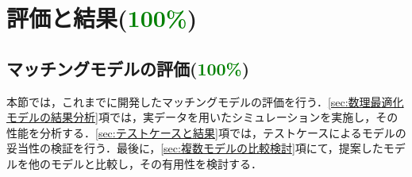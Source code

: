\section{評価と結果(\textcolor{green}{100\%})}
  \label{sec:評価と結果}
    \par
  
  \subsection{マッチングモデルの評価(\textcolor{green}{100\%})}
    \label{sec:マッチングモデルの評価}
      \par 本節では，これまでに開発したマッチングモデルの評価を行う．\ref{sec:数理最適化モデルの結果分析}項では，実データを用いたシミュレーションを実施し，その性能を分析する．\ref{sec:テストケースと結果}項では，テストケースによるモデルの妥当性の検証を行う．最後に，\ref{sec:複数モデルの比較検討}項にて，提案したモデルを他のモデルと比較し，その有用性を検討する．
  

